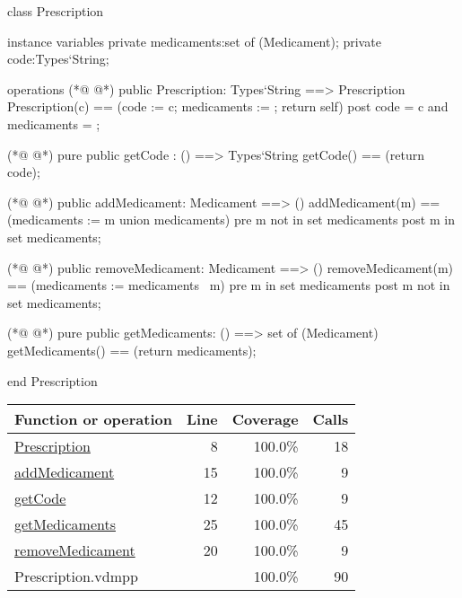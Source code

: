 \begin{vdmpp}[breaklines=true]
class Prescription

instance variables
  private medicaments:set of (Medicament);
  private code:Types`String;
  
operations
(*@
\label{Prescription:8}
@*)
 public Prescription: Types`String ==> Prescription
  Prescription(c) == (code := c; medicaments := {}; return self)
 post code = c and medicaments = {};
 
(*@
\label{getCode:12}
@*)
 pure public getCode : () ==> Types`String
  getCode() == (return code);
  
(*@
\label{addMedicament:15}
@*)
 public addMedicament: Medicament ==> ()
  addMedicament(m) == (medicaments := {m} union medicaments)
 pre m not in set medicaments
 post m in set medicaments;
  
(*@
\label{removeMedicament:20}
@*)
 public removeMedicament: Medicament ==> ()
  removeMedicament(m) == (medicaments := medicaments \ {m})
 pre m in set medicaments
 post m not in set medicaments;
  
(*@
\label{getMedicaments:25}
@*)
 pure public getMedicaments: () ==> set of (Medicament)
  getMedicaments() == (return medicaments);

end Prescription
\end{vdmpp}
\bigskip
\begin{longtable}{|l|r|r|r|}
\hline
Function or operation & Line & Coverage & Calls \\
\hline
\hline
\hyperref[Prescription:8]{Prescription} & 8&100.0\% & 18 \\
\hline
\hyperref[addMedicament:15]{addMedicament} & 15&100.0\% & 9 \\
\hline
\hyperref[getCode:12]{getCode} & 12&100.0\% & 9 \\
\hline
\hyperref[getMedicaments:25]{getMedicaments} & 25&100.0\% & 45 \\
\hline
\hyperref[removeMedicament:20]{removeMedicament} & 20&100.0\% & 9 \\
\hline
\hline
Prescription.vdmpp & & 100.0\% & 90 \\
\hline
\end{longtable}

